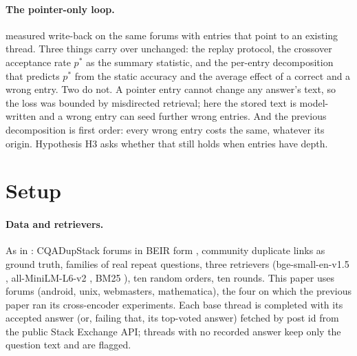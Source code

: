 \documentclass[11pt]{article}
\begin{document}
\paragraph{The pointer-only loop.} \citet{guthikonda2026accepted} measured write-back on the same forums with entries that point to an existing thread. Three things carry over unchanged: the replay protocol, the crossover acceptance rate $p^*$ as the summary statistic, and the per-entry decomposition that predicts $p^*$ from the static accuracy and the average effect of a correct and a wrong entry. Two do not. A pointer entry cannot change any answer's text, so the loss was bounded by misdirected retrieval; here the stored text is model-written and a wrong entry can seed further wrong entries. And the previous decomposition is first order: every wrong entry costs the same, whatever its origin. Hypothesis H3 asks whether that still holds when entries have depth.

\section{Setup}
\paragraph{Data and retrievers.} As in \citet{guthikonda2026accepted}: CQADupStack forums \citep{hoogeveen2015cqadupstack} in BEIR form \citep{thakur2021beir}, community duplicate links as ground truth, families of real repeat questions, three retrievers (bge-small-en-v1.5 \citep{xiao2024cpack}, all-MiniLM-L6-v2 \citep{wang2020minilm,reimers2019sbert}, BM25 \citep{robertson2009bm25}), ten random orders, ten rounds. This paper uses \nSubsGen{} forums (android, unix, webmasters, mathematica), the four on which the previous paper ran its cross-encoder experiments. Each base thread is completed with its accepted answer (or, failing that, its top-voted answer) fetched by post id from the public Stack Exchange API; threads with no recorded answer keep only the question text and are flagged.
\end{document}
